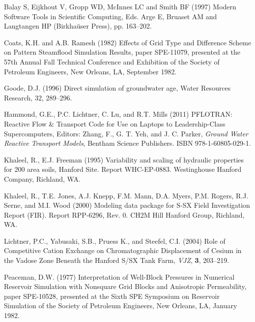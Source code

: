 \documentclass[12pt]{article}
\begin{document}
\begin{description}

\item Balay S, Eijkhout V, Gropp WD, McInnes LC and Smith BF (1997) Modern Software Tools in Scientific Computing, Eds. Arge E, Bruaset AM and Langtangen HP (Birkha\"user Press), pp. 163--202.

\item Coats, K.H. and A.B. Ramesh (1982) Effects of Grid Type and Difference Scheme on Pattern Steamflood Simulation Results, paper SPE-11079, presented at the 57th Annual Fall Technical Conference and Exhibition of the Society of Petroleum Engineers, New Orleans, LA, September 1982.

\item Goode, D.J. (1996) Direct simulation of groundwater age, Water Resources Research, 32, 289--296.

\item Hammond, G.E., P.C. Lichtner, C. Lu, and R.T. Mills (2011) PFLOTRAN: Reactive Flow \& Transport Code for Use on Laptops to Leadership-Class Supercomputers, Editors: Zhang, F., G. T. Yeh, and J. C. Parker,
{\em Ground Water Reactive Transport Models},
Bentham Science Publishers.
ISBN 978-1-60805-029-1. 

\item Khaleel, R., E.J. Freeman (1995) Variability and scaling of hydraulic properties for 200 area soils, Hanford Site. Report WHC-EP-0883. Westinghouse Hanford Company, Richland, WA.

\item Khaleel, R., T.E. Jones, A.J. Knepp, F.M. Mann, D.A. Myers, P.M. Rogers, R.J. Serne, and M.I. Wood (2000) Modeling data package for S-SX Field Investigation Report (FIR). Report RPP-6296, Rev. 0. CH2M Hill Hanford Group, Richland, WA.

\item Lichtner, P.C., Yabusaki, S.B., Pruess K., and Steefel, C.I. (2004) Role of Competitive Cation Exchange on Chromatographic Displacement of Cesium in the Vadose Zone Beneath the Hanford S/SX Tank Farm, {\em VJZ}, {\bf 3}, 203--219.

\item Peaceman, D.W. (1977) Interpretation of Well-Block Pressures in Numerical Reservoir Simulation with Nonsquare Grid Blocks and Anisotropic Permeability, paper SPE-10528, presented at the Sixth SPE Symposium on Reservoir Simulation of the Society of Petroleum Engineers, New Orleans, LA, January 1982.  


\end{description}
\end{document}
